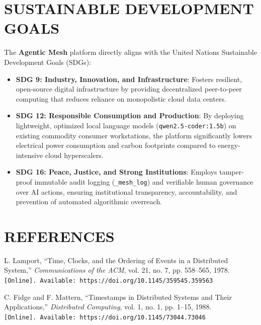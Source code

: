 \documentclass[12pt,a4paper]{report}
\begin{document}
\chapter*{SUSTAINABLE DEVELOPMENT GOALS}

\noindent
The \textbf{Agentic Mesh} platform directly aligns with the United Nations Sustainable Development Goals (SDGs):
\begin{itemize}[leftmargin=*,itemsep=4pt]
    \item \textbf{SDG 9: Industry, Innovation, and Infrastructure}: Fosters resilient, open-source digital infrastructure by providing decentralized peer-to-peer computing that reduces reliance on monopolistic cloud data centers.
    \item \textbf{SDG 12: Responsible Consumption and Production}: By deploying lightweight, optimized local language models (\texttt{qwen2.5-coder:1.5b}) on existing commodity consumer workstations, the platform significantly lowers electrical power consumption and carbon footprints compared to energy-intensive cloud hyperscalers.
    \item \textbf{SDG 16: Peace, Justice, and Strong Institutions}: Employs tamper-proof immutable audit logging (\texttt{\_mesh\_log}) and verifiable human governance over AI actions, ensuring institutional transparency, accountability, and prevention of automated algorithmic overreach.
\end{itemize}

\chapter*{REFERENCES}

\noindent
[1] L. Lamport, “Time, Clocks, and the Ordering of Events in a Distributed System,” \textit{Communications of the ACM}, vol. 21, no. 7, pp. 558--565, 1978. \\
\texttt{[Online]. Available: https://doi.org/10.1145/359545.359563}

\vspace{8pt}\noindent
[2] C. Fidge and F. Mattern, “Timestamps in Distributed Systems and Their Applications,” \textit{Distributed Computing}, vol. 1, no. 1, pp. 1--15, 1988. \\
\texttt{[Online]. Available: https://doi.org/10.1145/73044.73046}
\end{document}
